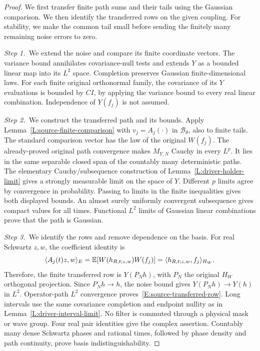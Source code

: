 \begin{proof}
  We first transfer finite path sums and their tails using the Gaussian
  comparison. We then identify the transferred rows on the given coupling. For
  stability, we make the common tail small before sending the finitely many
  remaining noise errors to zero.

  \medskip
  \noindent\textit{Step 1.~}We extend the noise and compare its finite
  coordinate vectors.
  The variance bound annihilates covariance-null tests and extends $Y$ as a
  bounded linear map into its $L^2$ space. Completion preserves Gaussian
  finite-dimensional laws. For each finite original orthonormal family, the
  covariance of its $Y$ evaluations is bounded by $CI$, by applying the variance
  bound to every real linear combination. Independence of $Y(f_j)$ is not
  assumed.

  \medskip
  \noindent\textit{Step 2.~}We construct the transferred path and its bounds.
  Apply Lemma~\ref{L:source-finite-comparison} with $v_j = A_j(\cdot)$ in
  $\mathscr{B}_\theta$, also to finite tails. The standard comparison vector has
  the law of the original $W(f_j)$. The already-proved original path convergence
  makes $M_{Y,N}$ Cauchy in every $L^p$. It lies in the same separable closed
  span of the countably many deterministic paths. The elementary
  Cauchy/subsequence construction of Lemma~\ref{L:driver-holder-limit} gives a
  strongly measurable limit on the space of $Y$. Different $p$ limits agree by
  convergence in probability. Passing to limits in the finite inequalities gives
  both displayed bounds. An almost surely uniformly convergent subsequence gives
  compact values for all times. Functional $L^2$ limits of Gaussian linear
  combinations prove that the path is Gaussian.


  \medskip
  \noindent\textit{Step 3.~}We identify the rows and remove dependence on the
  basis.
  For real Schwartz $z,w$, the coefficient identity is
  \[
    \langle A_j(t)z,w\rangle_E
    =\mathbb{E}[W(h_{R,t;z,w})W(f_j)]
    =\langle h_{R,t;z,w},f_j\rangle_{H_W}.
  \]
  Therefore, the finite transferred row is $Y(P_Nh)$, with $P_N$ the original
  $H_W$ orthogonal projection. Since $P_Nh \to h$, the noise bound gives
  $Y(P_Nh) \to Y(h)$ in $L^2$. Operator-path $L^2$ convergence
  proves~\eqref{E:source-transferred-row}. Long intervals use the same
  covariance completion and endpoint nullity as in
  Lemma~\ref{L:driver-interval-limit}. No filter is commuted through a physical
  mask or wave group. Four real pair identities give the complex assertion.
  Countably many dense Schwartz phases and rational times, followed by phase
  density and path continuity, prove basis indistinguishability.




\end{proof}
